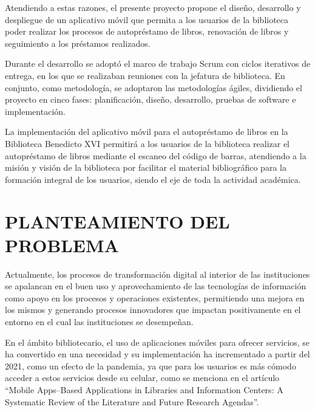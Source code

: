 \documentclass[spanish]{ieee_upb}
\begin{document}
Atendiendo a estas razones, el presente proyecto propone el diseño, desarrollo y despliegue de un aplicativo móvil que permita a los usuarios de la biblioteca poder realizar los procesos de autopréstamo de libros, renovación de libros y seguimiento a los préstamos realizados.
\vspace{0.3 cm}

Durante el desarrollo se adoptó el marco de trabajo Scrum con ciclos iterativos de entrega, en los que se realizaban reuniones con la jefatura de biblioteca. En conjunto, como metodología, se adoptaron las metodologías ágiles, dividiendo el proyecto en cinco fases: planificación, diseño, desarrollo, pruebas de software e implementación.
\vspace{0.3 cm}

La implementación del aplicativo móvil para el autopréstamo de libros en la Biblioteca Benedicto XVI permitirá a los usuarios de la biblioteca realizar el autopréstamo de libros mediante el escaneo del código de barras, atendiendo a la misión y visión de la biblioteca por facilitar el material bibliográfico para la formación integral de los usuarios, siendo el eje de toda la actividad académica.
\vspace{0.3 cm}



\newpage
\section{PLANTEAMIENTO DEL PROBLEMA}
Actualmente, los procesos de  transformación digital al interior de las instituciones se apalancan en el buen uso y aprovechamiento de las tecnologías de información como apoyo en los procesos y operaciones existentes, permitiendo una mejora en los mismos y generando procesos innovadores que impactan positivamente en el entorno en el cual las instituciones se desempeñan.  
\vspace{0.3 cm}

En el ámbito bibliotecario, el uso de aplicaciones móviles para ofrecer servicios, se ha convertido en una necesidad y su implementación ha incrementado a partir del 2021, como un efecto de la pandemia, ya que para los usuarios es más cómodo acceder a estos servicios desde su celular, como se menciona en el artículo “Mobile Apps–Based Applications in Libraries and Information Centers: A Systematic Review of the Literature and Future Research Agendas”. \cite{singh2023mobile}
\vspace{0.3 cm}
\end{document}

